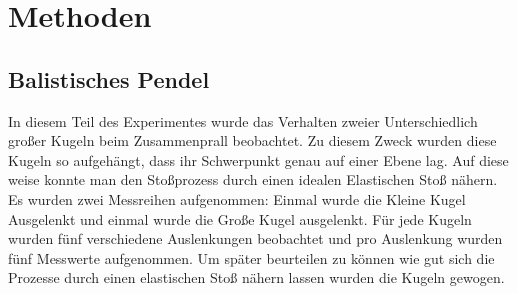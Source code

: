 \section{Methoden}
\subsection*{Balistisches Pendel}
In diesem Teil des Experimentes wurde das Verhalten zweier Unterschiedlich großer Kugeln beim Zusammenprall beobachtet.
Zu diesem Zweck wurden diese Kugeln so aufgehängt, dass ihr Schwerpunkt genau auf einer Ebene lag.
Auf diese weise konnte man den Stoßprozess durch einen idealen Elastischen Stoß nähern.
Es wurden zwei Messreihen aufgenommen: Einmal wurde die Kleine Kugel Ausgelenkt und einmal wurde die Große Kugel ausgelenkt.
Für jede Kugeln wurden fünf verschiedene Auslenkungen beobachtet und pro Auslenkung wurden fünf Messwerte aufgenommen.
Um später beurteilen zu können wie gut sich die Prozesse durch einen elastischen Stoß nähern lassen wurden die Kugeln gewogen.

